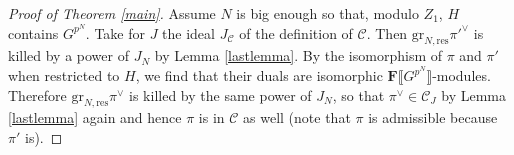\documentclass[11pt, oneside]{article}
\newcommand{\gres}{\text{gr}_{N,\text{res}}}
\theoremstyle{definition}
\begin{document}
	\begin{proof}[Proof of Theorem \ref{main}]
		Assume $N$ is big enough so that, modulo $Z_1$, $H$ contains $G^{p^N}$. Take for $J$ the ideal $J_{\mathcal C}$ of the definition of $\mathcal C$. Then $\gres\pi'^\vee$ is killed by a power of $J_N$ by Lemma \ref{lastlemma}. By the isomorphism of $\pi$ and $\pi'$ when restricted to $H$, we find that their duals are isomorphic $\mathbf F\llbracket G^{p^N}\rrbracket$-modules. Therefore $\gres\pi^\vee$ is killed by the same power of $J_N$, so that $\pi^\vee\in\mathcal C_J$ by Lemma \ref{lastlemma} again and hence $\pi$ is in $\mathcal C$ as well (note that $\pi$ is admissible because $\pi'$ is).
	\end{proof}
	
	 
\end{document}
